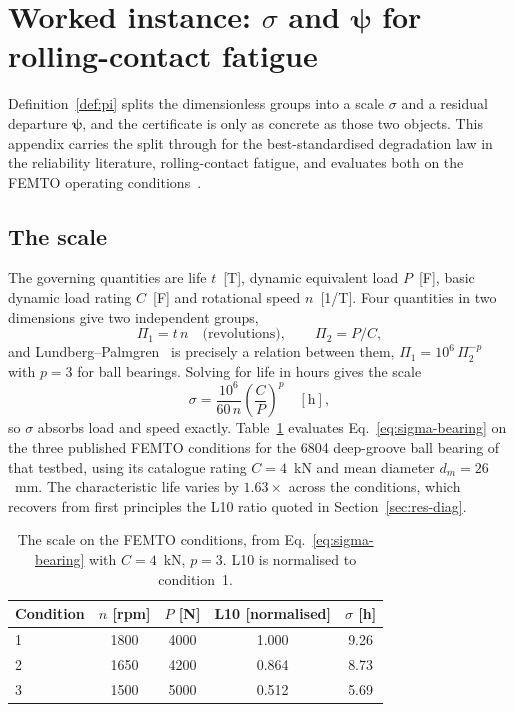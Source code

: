 \documentclass[review,times]{elsarticle}
\theoremstyle{definition}
\theoremstyle{remark}
\begin{document}
\section{Worked instance: $\sigma$ and $\boldsymbol\psi$ for rolling-contact fatigue}\label{app:bearing}
Definition~\ref{def:pi} splits the dimensionless groups into a scale $\sigma$ and a residual
departure $\boldsymbol\psi$, and the certificate is only as concrete as those two objects. This
appendix carries the split through for the best-standardised degradation law in the reliability
literature, rolling-contact fatigue, and evaluates both on the FEMTO operating
conditions~\cite{nectoux2012pronostia}.

\subsection*{The scale}
The governing quantities are life $t$~[T], dynamic equivalent load $P$~[F], basic dynamic load
rating $C$~[F] and rotational speed $n$~[1/T]. Four quantities in two dimensions give two
independent groups,
\[
\Pi_1=t\,n \quad\text{(revolutions)},\qquad \Pi_2=P/C,
\]
and Lundberg--Palmgren~\cite{lundberg1947dynamic,iso281} is precisely a relation between them,
$\Pi_1=10^{6}\,\Pi_2^{-p}$ with $p=3$ for ball bearings. Solving for life in hours gives the scale
\begin{equation}\label{eq:sigma-bearing}
\sigma=\frac{10^{6}}{60\,n}\left(\frac{C}{P}\right)^{p}\quad[\text{h}],
\end{equation}
so $\sigma$ absorbs load and speed exactly. Table~\ref{tab:bearing-sigma} evaluates
Eq.~\eqref{eq:sigma-bearing} on the three published FEMTO conditions for the 6804 deep-groove ball
bearing of that testbed, using its catalogue rating $C=4$~kN and mean diameter $d_m=26$~mm. The
characteristic life varies by $1.63\times$ across the conditions, which recovers from first
principles the L10 ratio quoted in Section~\ref{sec:res-diag}.

\begin{table}[h]\centering\footnotesize
\setlength{\tabcolsep}{10pt}\renewcommand{\arraystretch}{1.2}
\caption{The scale on the FEMTO conditions, from Eq.~\eqref{eq:sigma-bearing} with $C=4$~kN,
$p=3$. L10 is normalised to condition~1.}\label{tab:bearing-sigma}
\begin{tabular}{@{}lcccc@{}}\toprule
Condition & $n$ [rpm] & $P$ [N] & L10 [normalised] & $\sigma$ [h] \\\midrule
1 & 1800 & 4000 & 1.000 & 9.26 \\
2 & 1650 & 4200 & 0.864 & 8.73 \\
3 & 1500 & 5000 & 0.512 & 5.69 \\\bottomrule
\end{tabular}
\end{table}
\end{document}
